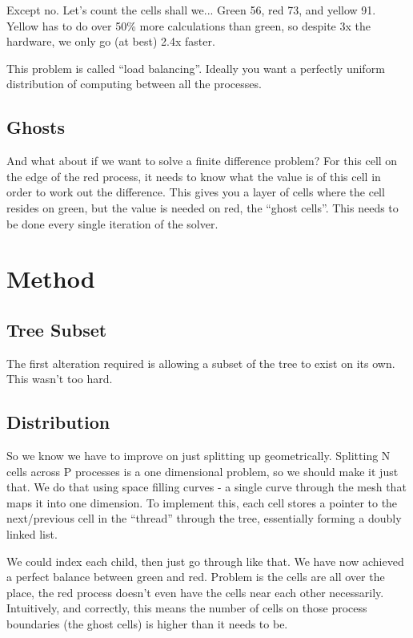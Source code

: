\documentclass[10pt]{article}
\begin{document}
		Except no. Let's count the cells shall we... Green 56, red 73, and yellow 91. Yellow has to do over 50\% more calculations than green, so despite 3x the hardware, we only go (at best) 2.4x faster.
		
		 This problem is called ``load balancing''. Ideally you want a perfectly uniform distribution of computing between all the processes. 

	\subsection{Ghosts}		
		
		And what about if we want to solve a finite difference problem? For this cell on the edge of the red process, it needs to know what the value is of this cell in order to work out the difference. This gives you a layer of cells where the cell resides on green, but the value is needed on red, the ``ghost cells''. This needs to be done every single iteration of the solver.
	

\section{Method}
    \subsection{Tree Subset}
		The first alteration required is allowing a subset of the tree to exist on its own. This wasn't too hard.    
    
    \subsection{Distribution}
    	So we know we have to improve on just splitting up geometrically. Splitting N cells across P processes is a one dimensional problem, so we should make it just that. We do that using space filling curves - a single curve through the mesh that maps it into one dimension. To implement this, each cell stores a pointer to the next/previous cell in the ``thread'' through the tree, essentially forming a doubly linked list. 
    	
    	We could index each child, then just go through like that. We have now achieved a perfect balance between green and red. Problem is the cells are all over the place, the red process doesn't even have the cells near each other necessarily. Intuitively, and correctly, this means the number of cells on those process boundaries (the ghost cells) is higher than it needs to be. 
    	
\end{document}
